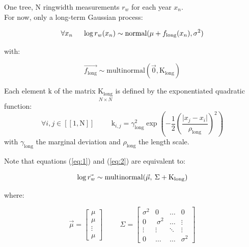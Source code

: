 \documentclass[11pt]{article}
\begin{document}
One tree, $\mathrm{N}$ ringwidth measurements $r_w$ for each year $x_n$.\\
For now, only a long-term Gaussian process:

\begin{equation}\label{eq:1}
\forall x_n  \hspace{0.5cm} \log{r_w(x_n)} \sim \text{normal}(\mu + f_{\text{long}}(x_n), \sigma^2)
\end{equation}

with:

\begin {equation}\label{eq:2}
\vec{f_{\text{long}}} \sim \text{multinormal}(\vec{0}, \mathrm{K_{\text{long}}})
\end{equation}

\vspace{0.5cm}
Each element $\mathrm{k}$ of the matrix $\underset{N\times N}{\mathrm{K}_{\text{long}}}$ is defined by the exponentiated quadratic function:
\begin {equation}
\forall i,j  \in [\![1,\mathrm{N}]\!] \hspace{1cm} \mathrm{k}_{i,j} = {\gamma_{\text{long}}^2} \exp\left(-\frac{1}{2}\left(\frac{\lvert x_j-x_i \rvert }{\rho_{\text{long}}}\right)^2\right)
\end{equation}
with $\gamma_{\text{long}}$ the marginal deviation and $\rho_{\text{long}}$ the length scale.

\vspace{0.5cm}
Note that equations (\ref{eq:1}) and (\ref{eq:2}) are equivalent to:

\begin{equation}
\log\vec{{r_w}} \sim \text{multinormal}(\vec{\mu}, \hspace{0.08cm} \Sigma + \mathrm{K}_{\text{long}})
\end{equation}

where:

\begin{equation}
    \vec{\mu} = \begin{bmatrix}
               \mu \\
               \mu \\
               \vdots \\
               \mu
    \end{bmatrix}
    \hspace{1cm}
	\Sigma = 
	\begin{bmatrix}
		\sigma^2  & 0 & \ldots & 0 \\
		0 & \ \sigma^2  & \ldots  & \vdots\\
		\vdots & \vdots & \ddots & \vdots \\
		0 & \ldots &  \ldots & \sigma^2 
	\end{bmatrix}
\end{equation}
\end{document}
